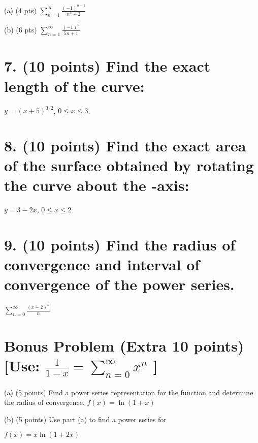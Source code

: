 (a) (4 pts) $\sum_{n=1}^{\infty}\frac{(-1)^{n-1}}{n^{4}+2}$

(b) (6 pts) $\sum_{n=1}^{\infty}\frac{(-1)^{n}}{5n+1}$  

\newpage

\section*{7. (10 points) Find the exact length of the curve:}

$y=(x+5)^{3/2}$, $0\le x\le3$.

\newpage

\section*{8. (10 points) Find the exact area of the surface obtained by rotating the curve about the  -axis:}

$y=3-2x$, $0\le x\le2$ 

\newpage

\section*{9. (10 points) Find the radius of convergence and interval of convergence of the power series.}
$\sum_{n=0}^{\infty} \frac{(x - 2)^n}{n}$ 

\newpage

\section*{Bonus Problem (Extra 10 points) [Use: $\frac{1}{1 - x} = \sum_{n=0}^{\infty} x^n$ ]}

(a) (5 points) Find a power series representation for the function and determine the radius of convergence. 
$f(x) = \ln(1 + x)$ 

(b) (5 points) Use part (a) to find a power series for

$f(x) = x \ln(1 + 2x)$